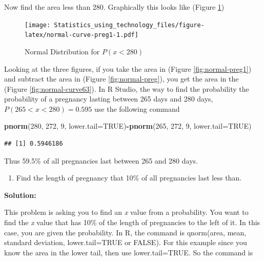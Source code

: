 \documentclass[]{book}
\newenvironment{Shaded}{\begin{snugshade}}{\end{snugshade}}
\newcommand{\DataTypeTok}[1]{\textcolor[rgb]{0.13,0.29,0.53}{#1}}
\newcommand{\DecValTok}[1]{\textcolor[rgb]{0.00,0.00,0.81}{#1}}
\newcommand{\KeywordTok}[1]{\textcolor[rgb]{0.13,0.29,0.53}{\textbf{#1}}}
\newcommand{\NormalTok}[1]{#1}
\newcommand{\OperatorTok}[1]{\textcolor[rgb]{0.81,0.36,0.00}{\textbf{#1}}}
\newcommand{\OtherTok}[1]{\textcolor[rgb]{0.56,0.35,0.01}{#1}}
\providecommand{\tightlist}{%
  \setlength{\itemsep}{0pt}\setlength{\parskip}{0pt}}
\begin{document}
Now find the area less than 280. Graphically this looks like (Figure \ref{fig:normal-curve-preg1})



\begin{figure}
\centering
\texttt{[image: Statistics\_using\_technology\_files/figure-latex/normal-curve-preg1-1.pdf]}
\caption{\label{fig:normal-curve-preg1}Normal Distribution for \(P(x<280)\)}
\end{figure}

Looking at the three figures, if you take the area in (Figure \ref{fig:normal-preg1}) and subtract the area in (Figure \ref{fig:normal-preg}), you get the area in the (Figure \ref{fig:normal-curve63}). In R Studio, the way to find the probability the probability of a pregnancy lasting between 265 days and 280 days, \(P(265<x<280)=0.595\) use the following command

\begin{Shaded}
\begin{Highlighting}[]
\KeywordTok{pnorm}\NormalTok{(}\DecValTok{280}\NormalTok{, }\DecValTok{272}\NormalTok{, }\DecValTok{9}\NormalTok{, }\DataTypeTok{lower.tail=}\OtherTok{TRUE}\NormalTok{)}\OperatorTok{-}\KeywordTok{pnorm}\NormalTok{(}\DecValTok{265}\NormalTok{, }\DecValTok{272}\NormalTok{, }\DecValTok{9}\NormalTok{, }\DataTypeTok{lower.tail=}\OtherTok{TRUE}\NormalTok{)}
\end{Highlighting}
\end{Shaded}

\begin{verbatim}
## [1] 0.5946186
\end{verbatim}

Thus 59.5\% of all pregnancies last between 265 and 280 days.

\begin{enumerate}
\def\labelenumi{\alph{enumi}.}
\setcounter{enumi}{4}
\tightlist
\item
  Find the length of pregnancy that 10\% of all pregnancies last less than.
\end{enumerate}

\textbf{Solution:}

This problem is asking you to find an \emph{x} value from a probability.
You want to find the \emph{x} value that has 10\% of the length of pregnancies to the left of it. In this case, you are given the probability. In R, the command is qnorm(area, mean, standard deviation, lower.tail=TRUE or FALSE). For this example since you know the area in the lower tail, then use lower.tail=TRUE. So the command is
\end{document}
